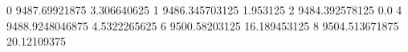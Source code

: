 0 9487.69921875 3.306640625
1 9486.345703125 1.953125
2 9484.392578125 0.0
4 9488.9248046875 4.5322265625
6 9500.58203125 16.189453125
8 9504.513671875 20.12109375
